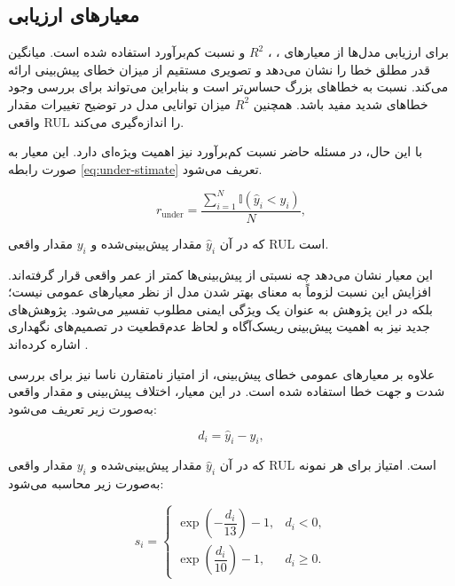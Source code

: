 \subsection{معیارهای ارزیابی}

برای ارزیابی مدل‌ها از معیارهای ، ، $R^2$ و نسبت کم‌برآورد استفاده شده است.  میانگین قدر مطلق خطا را نشان می‌دهد و تصویری مستقیم از میزان خطای پیش‌بینی ارائه می‌کند.  نسبت به خطاهای بزرگ حساس‌تر است و بنابراین می‌تواند برای بررسی وجود خطاهای شدید مفید باشد. همچنین $R^2$ میزان توانایی مدل در توضیح تغییرات مقدار واقعی RUL را اندازه‌گیری می‌کند.

با این حال، در مسئله حاضر نسبت کم‌برآورد نیز اهمیت ویژه‌ای دارد. این معیار به صورت رابطه 
\ref{eq:under-stimate}
تعریف می‌شود.

\begin{equation} \label{eq:under-stimate}
	r_{\mathrm{under}}
	=
	\frac{
		\sum_{i=1}^{N}
		\mathbb{I}(\hat{y}_i < y_i)
	}{
		N
	},
\end{equation}

که در آن $\hat{y}_i$ مقدار پیش‌بینی‌شده و $y_i$ مقدار واقعی \gls{RUL} است.

این معیار نشان می‌دهد چه نسبتی از پیش‌بینی‌ها کمتر از عمر واقعی قرار گرفته‌اند. افزایش این نسبت لزوماً به معنای بهتر شدن مدل از نظر معیارهای عمومی نیست؛ بلکه در این پژوهش به عنوان یک ویژگی ایمنی مطلوب تفسیر می‌شود. پژوهش‌های جدید نیز به اهمیت پیش‌بینی ریسک‌آگاه و لحاظ عدم‌قطعیت در تصمیم‌های نگهداری اشاره کرده‌اند \cite{diao2026reliable,hatipoglu2025matrix}.


علاوه بر معیارهای عمومی خطای پیش‌بینی، از امتیاز
نامتقارن ناسا  نیز برای
بررسی شدت و جهت خطا استفاده شده است. در این
معیار، اختلاف پیش‌بینی و مقدار واقعی به‌صورت
زیر تعریف می‌شود:

\begin{equation}
	d_i = \hat{y}_i-y_i,
\end{equation}

که در آن $\hat{y}_i$ مقدار پیش‌بینی‌شده و
$y_i$ مقدار واقعی \gls{RUL} است. امتیاز
برای هر نمونه به‌صورت زیر محاسبه می‌شود:

\begin{equation}
	s_i =
	\begin{cases}
		\exp\left(-\dfrac{d_i}{13}\right)-1,
		& d_i<0,\\[6pt]
		\exp\left(\dfrac{d_i}{10}\right)-1,
		& d_i\geq 0.
	\end{cases}
\end{equation}

